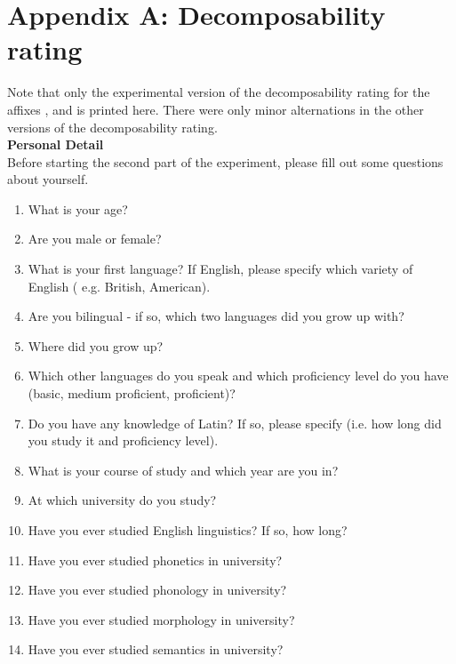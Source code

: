 
\appendix
\addappheadtotoc

\appendixpage

\section*{Appendix A: Decomposability rating} 

\label{Appendix A: Decomposability Rating}



Note that only the experimental version of the {decomposability rating} for the affixes ,  and  is printed here. There were only minor alternations in the other versions of the {decomposability rating}.\\


\noindent \textbf{Personal Detail}\\


\noindent  Before starting the second part of the experiment, please fill out some questions about yourself. \\
\begin{enumerate}

	\item What is your age?
	\item Are you male or female?
	\item What is your first language?  If English, please specify which variety of English ( e.g. British, American).	
	\item Are you bilingual - if so, which two languages did you grow up with?	
	\item Where did you grow up?
	\item Which other languages do you speak and which proficiency level do you have (basic, medium proficient, proficient)?
	\item Do you have any knowledge of Latin? If so, please specify (i.e. how long did you study it and proficiency level).
	\item What is your course of study and which year are you in?
	\item At which university do you study?
	\item Have you ever studied English linguistics? If so, how long?
	\item Have you ever studied phonetics in university?
	\item Have you ever studied phonology in university?
	\item Have you ever studied morphology in university?
	\item Have you ever studied semantics in university?
	
\end{enumerate}



